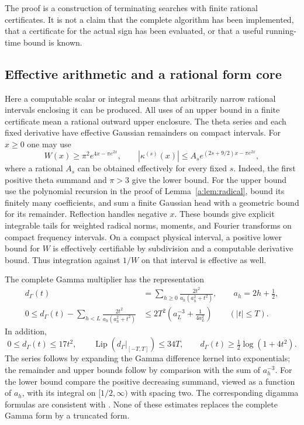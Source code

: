 \documentclass[11pt,a4paper]{article}
\numberwithin{equation}{section}
\theoremstyle{definition}\newtheorem{definition}[theorem]{Definition}
\theoremstyle{remark}\newtheorem{remark}[theorem]{Remark}
\begin{document}
The proof is a construction of terminating searches with finite rational
certificates.  It is not a claim that the complete algorithm has been
implemented, that a certificate for the actual sign has been evaluated, or that
a useful running-time bound is known.

\subsection{Effective arithmetic and a rational form core}
\label{vfourC:subsec:arithmetic}

Here a computable scalar or integral means that arbitrarily narrow rational
intervals enclosing it can be produced.  All uses of an upper bound in a finite
certificate mean a rational outward upper enclosure.  The theta series and each
fixed derivative have effective Gaussian remainders on compact intervals.  For
$x\ge0$ one may use
\begin{equation}\label{vfourC:eq:theta}
 W(x)\ge\pi^2 e^{4x-\pi e^{2x}},\qquad
 |\kappa^{(s)}(x)|\le A_s e^{(2s+9/2)x-\pi e^{2x}},
\end{equation}
where a rational $A_s$ can be obtained effectively for every fixed $s$.
Indeed, the first positive theta summand and $\pi>3$ give the lower bound.
For the upper bound use the polynomial recursion in the proof of
Lemma~\ref{a:lem:radical}, bound its finitely many coefficients, and sum a finite
Gaussian head with a geometric bound for its remainder.  Reflection handles
negative $x$.  These bounds give explicit integrable tails for weighted radical
norms, moments, and Fourier transforms on compact frequency intervals.  On a
compact physical interval, a positive lower bound for $W$ is effectively
certifiable by subdivision and a computable derivative bound.  Thus integration
against $1/W$ on that interval is effective as well.

The complete Gamma multiplier has the representation
\begin{equation}\label{vfourC:eq:gamma}
 \begin{split}
 d_\Gamma(t)&=\sum_{h\ge0}\frac{2t^2}{a_h(a_h^2+t^2)},
       \qquad a_h=2h+\tfrac12,\\
 0\le d_\Gamma(t)-\sum_{h<L}\frac{2t^2}{a_h(a_h^2+t^2)}
   &\le2T^2\left(a_L^{-3}+\frac1{4a_L^2}\right)
       \qquad(|t|\le T).
 \end{split}
\end{equation}
In addition,
\begin{equation}\label{vfourC:eq:gamma-bounds}
 0\le d_\Gamma(t)\le17t^2,\qquad
 \operatorname{Lip}(d_\Gamma|_{[-T,T]})\le34T,\qquad
 d_\Gamma(t)\ge\tfrac12\log(1+4t^2).
\end{equation}
The series follows by expanding the Gamma difference kernel into exponentials;
the remainder and upper bounds follow by comparison with the sum of $a_h^{-3}$.
For the lower bound compare the positive decreasing summand, viewed as a
function of $a_h$, with its integral on $[1/2,\infty)$ with spacing two.
The corresponding digamma formulas are consistent with
\cite[Eq.~5.9.16 and Eq.~5.11.2]{DLMF}.  None of these estimates replaces the
complete Gamma form by a truncated form.
\end{document}
